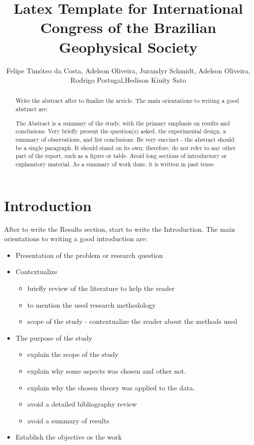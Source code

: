 \documentclass[twoside,letterpaper,twocolumn]{article}
\title{Latex Template for International Congress of the Brazilian Geophysical Society}
\author{Felipe Timóteo da Costa, Adelson Oliveira, Jurandyr Schmidt, Adelson Oliveira, Rodrigo Portugal,Hedison Kiuity Sato}
\begin{document}
\maketitle

\begin{abstract}

Write the abstract after to finalize the article. The main orientations to writing a good abstract are:

The Abstract is a summary of the study, with the primary emphasis on results and conclusions. Very briefly present the question(s) asked, the experimental design, a summary of observations, and list conclusions. Be very succinct - the abstract should be a single paragraph. It should stand on its own; therefore, do not refer to any other part of the report, such as a figure or table. Avoid long sections of introductory or explanatory material. As a summary of work done, it is written in past tense.

\end{abstract}

\section{Introduction}

After to write the Results section, start to write the Introduction. The main orientations to writing a good introduction are:

\begin{itemize}
	\item Presentation of the problem or research question
	\item Contextualize
	\begin{itemize}
		\item briefly review of the literature to help the reader
		\item to mention the used research methodology 
		\item scope of the study - contextualize the reader about the methods used
	\end{itemize}
	\item The purpose of the study
	\begin{itemize}
		\item explain the scope of the study
		\item explain why some aspects was chosen and other not.
		\item explain why the chosen theory was applied to the data.
		\item avoid a detailed bibliography review
		\item avoid a summary of results 
	\end{itemize}
	\item Establish the objective os the work
\end{itemize}
\end{document}
